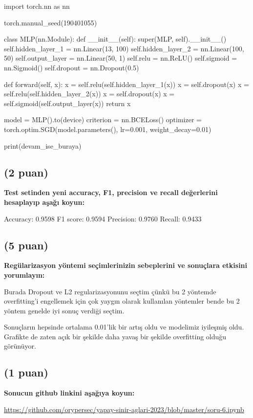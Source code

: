\documentclass[11pt]{article}
\begin{document}
\begin{python}
import torch.nn as nn

torch.manual_seed(190401055)

class MLP(nn.Module):
    def __init__(self):
        super(MLP, self).__init__()
        self.hidden_layer_1 = nn.Linear(13, 100)
        self.hidden_layer_2 = nn.Linear(100, 50)
        self.output_layer = nn.Linear(50, 1)
        self.relu = nn.ReLU()
        self.sigmoid = nn.Sigmoid()
        self.dropout = nn.Dropout(0.5)

    def forward(self, x):
        x = self.relu(self.hidden_layer_1(x))
        x = self.dropout(x)
        x = self.relu(self.hidden_layer_2(x))
        x = self.dropout(x)
        x = self.sigmoid(self.output_layer(x))
        return x

model = MLP().to(device)
criterion = nn.BCELoss()
optimizer = torch.optim.SGD(model.parameters(), lr=0.001, weight_decay=0.01)

print(devam_ise_buraya)
\end{python}

\subsection{(2 puan)} \textbf{Test setinden yeni accuracy, F1, precision ve recall değerlerini hesaplayıp aşağı koyun:}

Accuracy: 0.9598
F1 score: 0.9594
Precision: 0.9760
Recall: 0.9433

\subsection{(5 puan)} \textbf{Regülarizasyon yöntemi seçimlerinizin sebeplerini ve sonuçlara etkisini yorumlayın:}

Burada Dropout ve L2 regularizasyonunu seçtim çünkü bu 2 yöntemde overfitting'i engellemek için çok yaygın olarak kullanılan yöntemler bende bu 2 yöntem genelde iyi sonuç verdiği seçtim.

Sonuçların hepsinde ortalama 0.01'lik bir artış oldu ve modelimiz iyileşmiş oldu. Grafikte de zaten açık bir şekilde daha yavaş bir şekilde overfitting olduğu görünüyor.

\subsection{(1 puan)} \textbf{Sonucun github linkini  aşağıya koyun:}

\url{https://github.com/orypersec/yapay-sinir-aglari-2023/blob/master/soru-6.ipynb}
\end{document}
